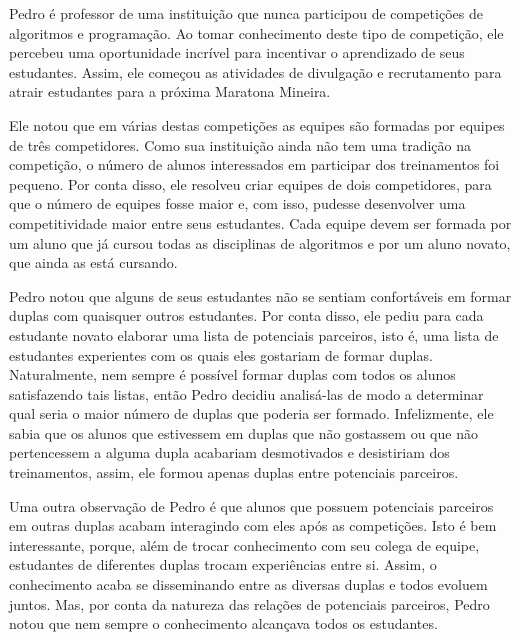 %

Pedro é professor de uma instituição que nunca participou de competições de algoritmos e programação. Ao tomar conhecimento deste tipo de competição,
ele percebeu uma oportunidade incrível para incentivar o aprendizado de seus estudantes. Assim, ele começou as atividades de divulgação e recrutamento
para atrair estudantes para a próxima Maratona Mineira.

Ele notou que em várias destas competições as equipes são formadas por equipes de três competidores. Como sua instituição ainda não tem uma tradição
na competição, o número de alunos interessados em participar dos treinamentos foi pequeno. Por conta disso, ele resolveu criar equipes de dois
competidores, para que o número de equipes fosse maior e, com isso, pudesse desenvolver uma competitividade maior entre seus estudantes.
Cada equipe devem ser formada por um aluno que já cursou todas as disciplinas de algoritmos e por um aluno novato, que ainda as está cursando.

Pedro notou que alguns de seus estudantes não se sentiam confortáveis em formar duplas com quaisquer outros estudantes. Por conta disso, ele pediu
para cada estudante novato elaborar uma lista de potenciais parceiros, isto é, uma lista de estudantes experientes com os quais eles gostariam
de formar duplas.
Naturalmente, nem sempre é possível formar duplas com todos os alunos satisfazendo tais listas, então Pedro decidiu analisá-las de modo a determinar
qual seria o maior número de duplas que poderia ser formado.
Infelizmente, ele sabia que os alunos que estivessem em duplas que não gostassem ou que não pertencessem a alguma dupla acabariam desmotivados e
desistiriam dos treinamentos, assim, ele formou apenas duplas entre potenciais parceiros.

Uma outra observação de Pedro é que alunos que possuem potenciais parceiros em outras duplas acabam interagindo com eles após as competições.
Isto é bem interessante, porque, além de trocar conhecimento com seu colega de equipe, estudantes de diferentes duplas trocam experiências entre si.
Assim, o conhecimento acaba se disseminando entre as diversas duplas e todos evoluem juntos. Mas, por conta da natureza das relações de potenciais
parceiros, Pedro notou que nem sempre o conhecimento alcançava todos os estudantes.

